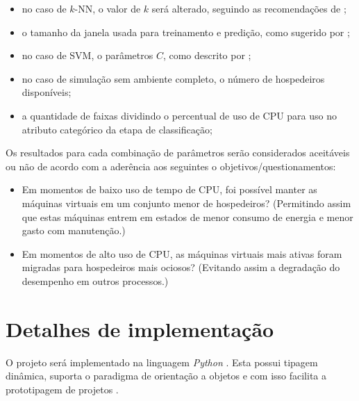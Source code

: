 \begin{itemize}
  \item no caso de $k$-NN, o valor de $k$ será alterado, seguindo as
        recomendações de ;
   \item o tamanho da janela usada para treinamento e predição, como sugerido
        por ;
   \item no caso de SVM, o parâmetros $C$, como descrito por ;
   \item no caso de simulação sem ambiente completo, o número de hospedeiros disponíveis;
   \item a quantidade de faixas dividindo o percentual de uso de CPU para
         uso no atributo categórico da etapa de classificação;
\end{itemize}


Os resultados para cada combinação de parâmetros serão considerados
aceitáveis ou não de acordo com a aderência aos seguintes o
objetivos/questionamentos:
\begin{itemize}
  \item Em momentos de baixo uso de tempo de CPU, foi possível manter as
        máquinas virtuais em um conjunto menor de hospedeiros? (Permitindo
        assim que estas máquinas entrem em estados de menor consumo de
        energia e menor gasto com manutenção.)
  \item Em momentos de alto uso de CPU, as máquinas virtuais mais ativas
        foram migradas para hospedeiros mais ociosos? (Evitando assim a
        degradação do desempenho em outros processos.)
\end{itemize}

\section{Detalhes de implementação}

O projeto será implementado na linguagem \emph{Python} \cite{rossum1995python}.
Esta possui tipagem dinâmica, suporta o paradigma de orientação a objetos e com
isso facilita a prototipagem de projetos \cite{lutz2006programming}.

